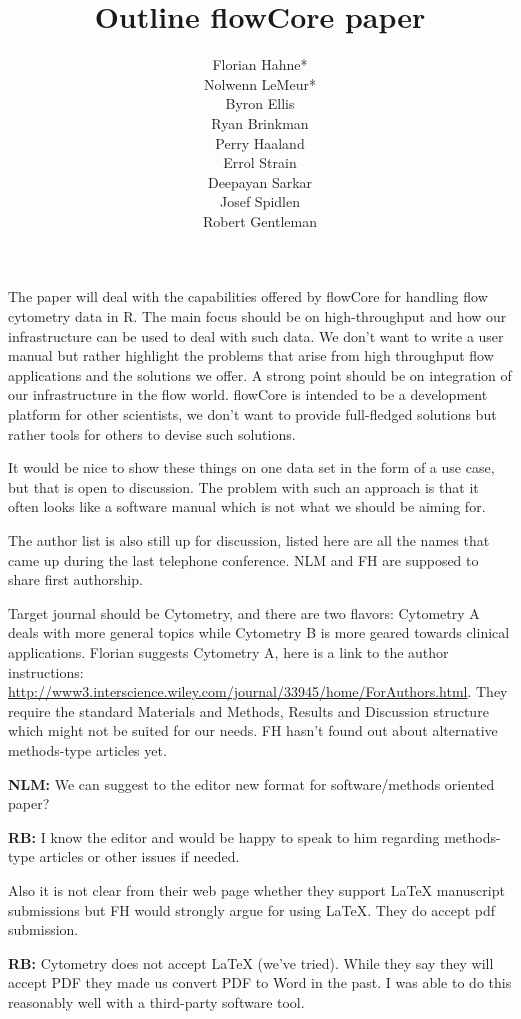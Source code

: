 \documentclass[12pt]{article}
\title{Outline flowCore paper}
\author{Florian Hahne*\\
  Nolwenn LeMeur*\\
  Byron Ellis\\
  Ryan Brinkman\\
  Perry Haaland\\
  Errol Strain\\
  Deepayan Sarkar\\
  Josef Spidlen\\
  Robert Gentleman
 }
\begin{document}
\maketitle

\vspace{2ex} 

The paper will deal with the capabilities offered by flowCore for
handling flow cytometry data in R. The main focus should be on
high-throughput and how our infrastructure can be used to deal with
such data. We don't want to write a user manual but rather highlight
the problems that arise from high throughput flow applications and the
solutions we offer. A strong point should be on integration of our
infrastructure in the flow world. flowCore is intended to be a
development platform for other scientists, we don't want to provide
full-fledged solutions but rather tools for others to devise such
solutions.

It would be nice to show these things on one data set in the form of a
use case, but that is open to discussion. The problem with such an
approach is that it often looks like a software manual which is not
what we should be aiming for. 

\bigskip
The author list is also still up for discussion, listed here are all
the names that came up during the last telephone conference. NLM and
FH are supposed to share first authorship.

\bigskip
Target journal should be Cytometry, and there are two flavors:
Cytometry A deals with more general topics while Cytometry B is more
geared towards clinical applications. Florian suggests Cytometry A,
here is a link to the author instructions:
\url{http://www3.interscience.wiley.com/journal/33945/home/ForAuthors.html}.
They require the standard Materials and Methods, Results and
Discussion structure which might not be suited for our needs. FH
hasn't found out about alternative methods-type articles yet.  

{\bf NLM:} We can suggest to the editor new format for software/methods
oriented paper?

{\bf RB:} I know the editor and would be happy to speak to him
regarding methods-type articles or other issues if needed.

Also it is not clear from their web page whether they support LaTeX
manuscript submissions but FH would strongly argue for using
LaTeX. They do accept pdf submission.

{\bf RB:} Cytometry does not accept LaTeX (we've tried). While they say
they will accept PDF they made us convert PDF to Word in the past. I
was able to do this reasonably well with a third-party software tool.
\end{document}
